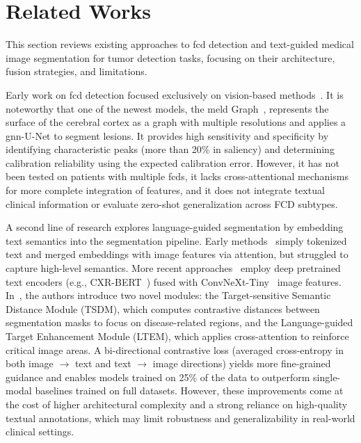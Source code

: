 \documentclass[FCD_GNN.tex]{subfiles}
\begin{document}
\chapter{Related Works}

This section reviews existing approaches to \ac{fcd} detection and text-guided medical image segmentation for tumor detection 
tasks, focusing on their architecture, fusion strategies, and limitations.

Early work on \ac{fcd} detection focused exclusively on vision-based methods~\cite{Durgam2025LungCancer, Abdusalomov2023BrainTumor, Sharma2025KidneyCT, Mehmood2025BreastCancer}. 
It is noteworthy that one of the newest models, the \ac{meld} Graph~\cite{Ripart2025MELD}, represents the surface of the cerebral cortex as a graph with multiple resolutions and applies a \ac{gnn}-U-Net to segment lesions. It provides high 
sensitivity and specificity by identifying characteristic peaks (more than 20\% in saliency) and determining calibration reliability using the expected 
calibration error. However, it has not been tested on patients with multiple \ac{fcd}s, it lacks cross-attentional mechanisms for more complete integration of 
features, and it does not integrate textual clinical information or evaluate zero-shot generalization across FCD subtypes.

A second line of research explores language-guided segmentation by embedding text semantics into the segmentation pipeline. 
Early methods~\cite{Tomar2022TGANet, Li2023LViT} simply tokenized text and merged embeddings with image features via attention, 
but struggled to capture high-level semantics. 
More recent approaches~\cite{Lee2023TextGuided, Zhong2023Ariadne} employ deep pretrained text encoders (e.g., CXR-BERT~\cite{CXR-BERT}) fused with ConvNeXt-Tiny~\cite{Liu2022ConvNeXt} image features. 
In~\cite{Li2024LGMSeg}, the authors introduce two novel modules: the Target-sensitive Semantic Distance Module (TSDM), 
which computes contrastive distances between segmentation masks to focus on disease-related regions, 
and the Language-guided Target Enhancement Module (LTEM), which applies cross-attention to reinforce critical image areas. 
A bi-directional contrastive loss (averaged cross-entropy in both image $\rightarrow$ text and text $\rightarrow$ image directions) yields more fine-grained guidance 
and enables models trained on 25\% of the data to outperform single-modal baselines trained on full datasets. 
However, these improvements come at the cost of higher architectural complexity and a strong reliance on high-quality textual annotations, 
which may limit robustness and generalizability in real-world clinical settings.
\end{document}
